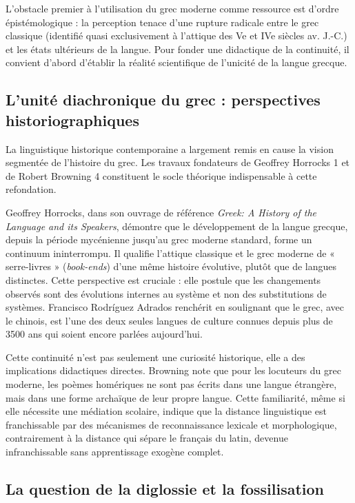 L'obstacle premier à l'utilisation du grec moderne comme ressource est d'ordre épistémologique : la
perception tenace d'une rupture radicale entre le grec \og classique\fg{} (identifié quasi
exclusivement à l'attique des Ve et IVe siècles av. J.-C.) et les états ultérieurs de la langue.
Pour fonder une didactique de la continuité, il convient d'abord d'établir la réalité scientifique
de l'unicité de la langue grecque.



\subsection{L'unité diachronique du grec : perspectives historiographiques}

La linguistique historique contemporaine a largement remis en cause la vision segmentée de
l'histoire du grec. Les travaux fondateurs de Geoffrey Horrocks 1 et de Robert Browning 4
constituent le socle théorique indispensable à cette refondation.

Geoffrey Horrocks, dans son ouvrage de référence \textit{Greek: A History of the Language and its
Speakers}, démontre que le développement de la langue grecque, depuis la période mycénienne jusqu'au
grec moderne standard, forme un continuum ininterrompu. Il qualifie l'attique classique et le grec
moderne de « serre-livres » (\textit{book-ends}) d'une même histoire évolutive, plutôt que de
langues distinctes.\cite{ref1} Cette perspective est cruciale : elle postule que les changements
observés sont des évolutions internes au système et non des substitutions de systèmes. Francisco
Rodríguez Adrados renchérit en soulignant que le grec, avec le chinois, est l'une des deux seules
langues de culture connues depuis plus de 3500 ans qui soient encore parlées aujourd'hui.\cite{ref7}

Cette continuité n'est pas seulement une curiosité historique, elle a des implications didactiques
directes. Browning note que pour les locuteurs du grec moderne, les poèmes homériques ne sont pas
écrits dans une langue étrangère, mais dans une forme archaïque de leur propre langue.\cite{ref5}
Cette familiarité, même si elle nécessite une médiation scolaire, indique que la distance
linguistique est franchissable par des mécanismes de reconnaissance lexicale et morphologique,
contrairement à la distance qui sépare le français du latin, devenue infranchissable sans
apprentissage exogène complet.



\subsection{La question de la diglossie et la fossilisation}

